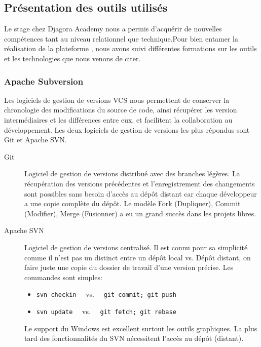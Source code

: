 \subsection{Présentation des outils utilisés}

Le stage chez Djagora Academy nous a permis d'acquérir de nouvelles compétences
tant au niveau relationnel que technique.Pour bien entamer la réalisation de la
plateforme , nous avons suivi différentes formations sur
les outils et les technologies que nous venons de citer.

\subsubsection{Apache Subversion}

Les logiciels de gestion de versions \acrshort{VCS} nous permettent de conserver la
chronologie des modifications du source de code, ainsi récupérer les version
intermédiaires et les différences entre eux, et facilitent la collaboration au
développement.  Les deux logiciels de gestion de versions les plus répondus
sont Git et Apache SVN.

\begin{description}
    \item [Git] Logiciel de gestion de versions distribué avec des branches
        légères. La récupération des versions précédentes et l'enregistrement
        des changements sont possibles sans besoin d'accès au dépôt distant car
        chaque développeur a une copie complète du dépôt. Le modèle Fork
        (Dupliquer), Commit (Modifier), Merge (Fusionner) a eu un grand succès
        dans les projets libres.
    \item [Apache SVN] Logiciel de gestion de versions centralisé. Il est connu
        pour sa simplicité comme il n'est pas un distinct entre un dépôt local
        vs. Dépôt distant, on faire juste une copie du dossier de travail d'une
        version précise. Les commandes sont simples:
        \begin{itemize}
            \item \verb|svn checkin| \ \ vs. \ \ \verb|git commit; git push|
            \item \verb|svn update| \ \ vs. \ \ \verb|git fetch; git rebase|
        \end{itemize}
        Le support du Windows est excellent surtout les outils graphiques.  La
        plus tard des fonctionnalités du SVN nécessitent l'accès au dépôt
        (distant).
\end{description}

